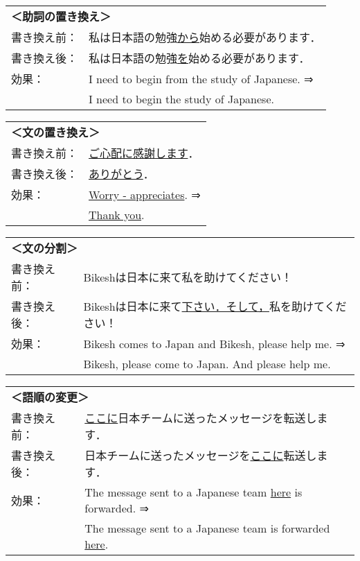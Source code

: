 \begin{tabular}{ll}
\multicolumn{2}{l}{\bf ＜助詞の置き換え＞}   \\
書き換え前： & 私は日本語の勉強\underline{から}始める必要があります．\\
書き換え後： & 私は日本語の勉強\underline{を}始める必要があります．\\
効果： & I need to begin from the study of Japanese. ⇒ \\
       & I need to begin the study of Japanese. \\ 
\end{tabular}

\begin{tabular}{ll}
\multicolumn{2}{l}{\bf ＜文の置き換え＞}   \\
書き換え前： & \underline{ご心配に感謝します}．\\
書き換え後： & \underline{ありがとう}．\\
効果： & \underline{Worry - appreciates}. ⇒ \\
       & \underline{Thank you}. \\
\end{tabular}

\begin{tabular}{ll}
\multicolumn{2}{l}{\bf ＜文の分割＞}   \\
書き換え前： & Bikeshは日本に来て私を助けてください！ \\
書き換え後： & Bikeshは日本に来て\underline{下さい．そして，}私を助けてください！ \\
効果： & Bikesh comes to Japan and Bikesh, please help me. ⇒ \\
       & Bikesh, please come to Japan. And please help me. \\
\end{tabular}

\begin{tabular}{ll}
\multicolumn{2}{l}{\bf ＜語順の変更＞}   \\
書き換え前： & \underline{ここに}日本チームに送ったメッセージを転送します． \\
書き換え後： & 日本チームに送ったメッセージを\underline{ここに}転送します． \\
効果： & The message sent to a Japanese team \underline{here} is forwarded. 
         ⇒ \\
       & The message sent to a Japanese team is forwarded \underline{here}. \\
\end{tabular}


